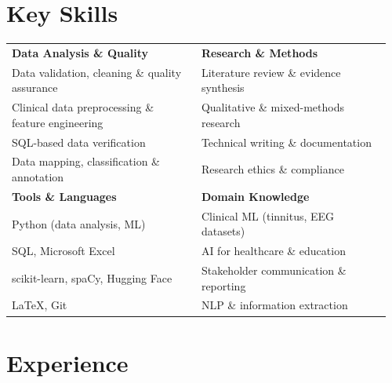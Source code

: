 \documentclass[10.5pt,a4paper]{article}
\newcommand{\tabitem}{{\color{accent!70}\textbullet}\enspace}
\begin{document}
\section{Key Skills}

\renewcommand{\arraystretch}{1.35}
\begin{tabular}{@{}p{0.48\linewidth}p{0.48\linewidth}@{}}
  \textbf{\color{mid}Data Analysis \& Quality}
    & \textbf{\color{mid}Research \& Methods} \\
  \tabitem Data validation, cleaning \& quality assurance
    & \tabitem Literature review \& evidence synthesis \\
  \tabitem Clinical data preprocessing \& feature engineering
    & \tabitem Qualitative \& mixed-methods research \\
  \tabitem SQL-based data verification
    & \tabitem Technical writing \& documentation \\
  \tabitem Data mapping, classification \& annotation
    & \tabitem Research ethics \& compliance \\[20pt]
  \textbf{\color{mid}Tools \& Languages}
    & \textbf{\color{mid}Domain Knowledge} \\
  \tabitem Python (data analysis, ML)
    & \tabitem Clinical ML (tinnitus, EEG datasets) \\
  \tabitem SQL, Microsoft Excel
    & \tabitem AI for healthcare \& education \\
  \tabitem scikit-learn, spaCy, Hugging Face
    & \tabitem Stakeholder communication \& reporting \\
  \tabitem LaTeX, Git
    & \tabitem NLP \& information extraction \\
\end{tabular}
\renewcommand{\arraystretch}{1}

\section{Experience}
\end{document}

